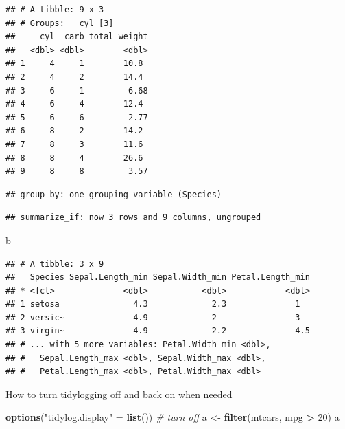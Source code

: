 \documentclass[
]{book}
\newenvironment{Shaded}{\begin{snugshade}}{\end{snugshade}}
\newcommand{\CommentTok}[1]{\textcolor[rgb]{0.56,0.35,0.01}{\textit{#1}}}
\newcommand{\DataTypeTok}[1]{\textcolor[rgb]{0.13,0.29,0.53}{#1}}
\newcommand{\DecValTok}[1]{\textcolor[rgb]{0.00,0.00,0.81}{#1}}
\newcommand{\KeywordTok}[1]{\textcolor[rgb]{0.13,0.29,0.53}{\textbf{#1}}}
\newcommand{\NormalTok}[1]{#1}
\newcommand{\OperatorTok}[1]{\textcolor[rgb]{0.81,0.36,0.00}{\textbf{#1}}}
\newcommand{\StringTok}[1]{\textcolor[rgb]{0.31,0.60,0.02}{#1}}
\begin{document}
\begin{verbatim}
## # A tibble: 9 x 3
## # Groups:   cyl [3]
##     cyl  carb total_weight
##   <dbl> <dbl>        <dbl>
## 1     4     1        10.8 
## 2     4     2        14.4 
## 3     6     1         6.68
## 4     6     4        12.4 
## 5     6     6         2.77
## 6     8     2        14.2 
## 7     8     3        11.6 
## 8     8     4        26.6 
## 9     8     8         3.57
\end{verbatim}

\begin{Shaded}
\end{Shaded}

\begin{verbatim}
## group_by: one grouping variable (Species)
\end{verbatim}

\begin{verbatim}
## summarize_if: now 3 rows and 9 columns, ungrouped
\end{verbatim}

\begin{Shaded}
\begin{Highlighting}[]
\NormalTok{b}
\end{Highlighting}
\end{Shaded}

\begin{verbatim}
## # A tibble: 3 x 9
##   Species Sepal.Length_min Sepal.Width_min Petal.Length_min
## * <fct>              <dbl>           <dbl>            <dbl>
## 1 setosa               4.3             2.3              1  
## 2 versic~              4.9             2                3  
## 3 virgin~              4.9             2.2              4.5
## # ... with 5 more variables: Petal.Width_min <dbl>,
## #   Sepal.Length_max <dbl>, Sepal.Width_max <dbl>,
## #   Petal.Length_max <dbl>, Petal.Width_max <dbl>
\end{verbatim}

How to turn tidylogging off and back on when needed

\begin{Shaded}
\begin{Highlighting}[]
\KeywordTok{options}\NormalTok{(}\StringTok{"tidylog.display"}\NormalTok{ =}\StringTok{ }\KeywordTok{list}\NormalTok{())  }\CommentTok{# turn off}
\NormalTok{a <-}\StringTok{ }\KeywordTok{filter}\NormalTok{(mtcars, mpg }\OperatorTok{>}\StringTok{ }\DecValTok{20}\NormalTok{)}
\NormalTok{a}
\end{Highlighting}
\end{Shaded}
\end{document}
